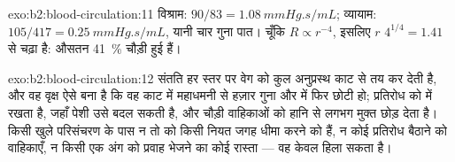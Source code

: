 \begin{solution}{exo:b2:blood-circulation:11}
विश्राम: $90/83 = \qty{1.08}{mmHg.s/mL}$; व्यायाम: $105/417 =
\qty{0.25}{mmHg.s/mL}$, यानी चार गुना पात। चूँकि $R \propto r^{-4}$,
इसलिए $r$ $4^{1/4} = 1.41$ से चढ़ा है:  औसतन
\qty{41}{\%} चौड़ी हुई हैं।
\end{solution}

\begin{solution}{exo:b2:blood-circulation:12}
संतति हर स्तर पर वेग को कुल अनुप्रस्थ काट से तय कर देती
है, और वह वृक्ष ऐसे बना है कि वह काट  में महाधमनी से
हज़ार गुना और  में फिर छोटी हो;
 प्रतिरोध को  में रखता है,
जहाँ पेशी उसे बदल सकती है, और चौड़ी वाहिकाओं को हानि से लगभग
मुक्त छोड़ देता है। किसी खुले परिसंचरण के पास न तो  को किसी नियत जगह
धीमा करने को  हैं, न कोई प्रतिरोध बैठाने को वाहिकाएँ, न किसी एक
अंग को प्रवाह भेजने का कोई रास्ता --- वह केवल हिला सकता है।
\end{solution}

